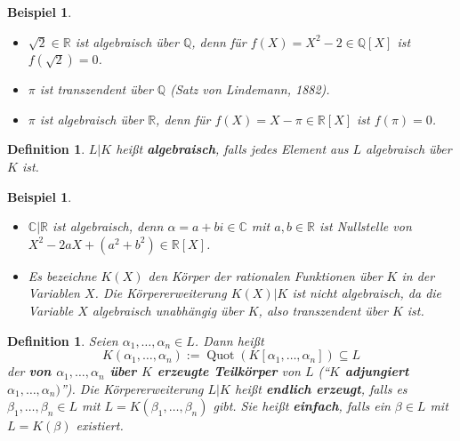 \documentclass[a4paper, twoside, 11pt, ngerman]{report}
\newcommand{\CC}{\mathds C}
\newcommand{\QQ}{\mathds Q}
\newcommand{\RR}{\mathds R}
\DeclareMathOperator{\Quot}{Quot}
\theoremstyle{definistyle}
\newtheorem{defini}[satz]{Definition}
\newtheorem{bsp}[satz]{Beispiel}
\theoremstyle{remark}
\newcommand{\defn}[1]{\textit{\bfseries #1}}
\begin{document}
\begin{bsp}\label{bsp:algebraisch_transzendent}
\begin{itemize}
    \item[(a)] $\sqrt{2} \in \RR$ ist algebraisch über $\QQ$, denn für $f(X) = X^2 - 2 \in \QQ[X]$ ist $f(\sqrt{2})=0$.
    \item[(b)] $\pi$ ist transzendent über $\QQ$ (Satz von Lindemann, 1882).
    \item[(c)] $\pi$ ist algebraisch über $\RR$, denn für $f(X) = X - \pi \in \RR[X]$ ist $f(\pi)=0$.
\end{itemize}
\end{bsp}

\begin{defini}\label{def:algebraische_koerpererweiterung}
$L|K$ heißt \defn{algebraisch}, falls jedes Element aus $L$ algebraisch über $K$ ist.
\end{defini}

\begin{bsp}\label{bsp:algebraische_erweiterung}
\begin{itemize}
    \item[(a)] $\CC|\RR$ ist algebraisch, denn $\alpha = a + bi \in \CC$ mit $a, b \in \RR$ ist Nullstelle von $X^2-2aX+(a^2+b^2)\in\RR[X]$.
    \item[(b)] Es bezeichne $K(X)$ den Körper der rationalen Funktionen über $K$ in der Variablen $X$. Die Körpererweiterung $K(X)|K$ ist nicht algebraisch, da die Variable $X$ algebraisch unabhängig über $K$, also transzendent über $K$ ist.
\end{itemize}
\end{bsp}

\begin{defini}\label{def:erzeugte_unterkoerper}
Seien $\alpha_1, \dots, \alpha_n \in L$. Dann heißt
\[
K(\alpha_1, \dots, \alpha_n) := \Quot(K[\alpha_1, \dots, \alpha_n]) \subseteq L
\]
der \defn{von $\alpha_1, \dots, \alpha_n$ über $K$ erzeugte Teilkörper} von $L$ ("`\defn{$K$ adjungiert $\alpha_1,\ldots,\alpha_n)$}"'). Die Körpererweiterung $L|K$ heißt \defn{endlich erzeugt}, falls es $\beta_1, \dots, \beta_n \in L$ mit $L = K(\beta_1, \dots, \beta_n)$ gibt. Sie heißt \defn{einfach}, falls ein $\beta\in L$ mit $L = K(\beta)$ existiert.
\end{defini}
\end{document}
